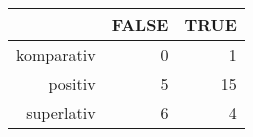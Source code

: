 \begin{tabular}{rrr}
  \hline
 & FALSE & TRUE \\ 
  \hline
komparativ & 0 & 1 \\ 
  positiv & 5 & 15 \\ 
  superlativ & 6 & 4 \\ 
   \hline
\end{tabular}
